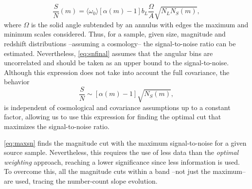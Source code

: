 \begin{equation}
\frac{S}{N}(m) = \langle\omega_0\rangle[\alpha(m)-1]b_L\frac{\Omega}{A}\sqrt{N_LN_S(m)},
\label{eq:snfinal}
\end{equation}
where $\Omega$ is the solid angle subtended by an annulus with edges the maximum and minimum scales considered. Thus, for a sample, given size, magnitude and redshift distributions --assuming a cosmology-- the signal-to-noise ratio can be estimated. Nevertheless, \autoref{eq:snfinal} assumes that the angular bins are uncorrelated and should be taken as an upper bound to the signal-to-noise. Although this expression does not take into account the full covariance, the behavior
\begin{equation}
\frac{S}{N} \sim [\alpha(m)-1]\sqrt{N_S(m)},
\label{eq:maxsn}
\end{equation}
is independent of cosmological and covariance assumptions up to a constant factor, allowing us to use this expression for finding the optimal cut that maximizes the signal-to-noise ratio.
\newline

\autoref{eq:maxsn} finds the magnitude cut with the maximum signal-to-noise for a given source sample. Nevertheless, this requires the use of less data than the {\it optimal weighting } approach, reaching a lower significance since less information is used. To overcome this, all the magnitude cuts within a band --not just the maximum-- are used, tracing the number-count slope evolution.

